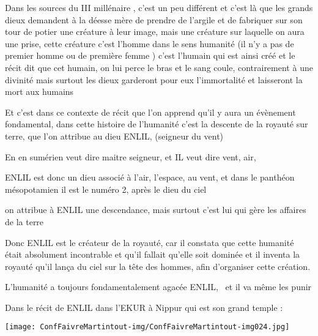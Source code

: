 \documentclass[a4paper]{article}
\begin{document}
{
Dans les sources du III millénaire , c'est un peu différent et c'est là
que les grands dieux demandent à la déesse mère de prendre de l'argile
et de fabriquer sur son tour de potier une créature à leur image, mais
une créature sur laquelle on aura une prise, cette créature c'est
l'homme dans le sens humanité (il n'y a pas de premier homme ou de
première femme ) c'est l'humain qui est ainsi créé et le récit dit que
cet humain, on lui perce le bras et le sang coule, contrairement à une
divinité mais surtout les dieux garderont pour eux l'immortalité et
laisseront la mort aux humains}

{
Et c'est dans ce contexte de récit que l'on apprend qu'il y aura un
évènement fondamental, dans cette histoire de l'humanité c'est la
descente de la royauté sur terre, que l'on attribue au dieu ENLIL,
(seigneur du vent)}

{
En en sumérien veut dire maitre seigneur, et IL veut dire vent, air, }

{
ENLIL est donc un dieu associé à l'air, l'espace, au vent, et dans le
panthéon mésopotamien il est le numéro 2, après le dieu du ciel}

{
on attribue à ENLIL une descendance, mais surtout c'est lui qui gère les
affaires de la terre}


\bigskip

{
Donc ENLIL est le créateur de la royauté, car il constata que cette
humanité était absolument incontrable et qu'il fallait qu'elle soit
dominée et il inventa la royauté qu'il lança du ciel sur la tête des
hommes, afin d'organiser cette création. }

{
L'humanité a toujours fondamentalement agacée ENLIL, \ et il va même les
punir}


\bigskip


\bigskip


\bigskip


\bigskip


\bigskip


\bigskip


\bigskip


\bigskip

{
Dans le récit de ENLIL dans l'EKUR à Nippur qui est son grand temple :}


\bigskip


\texttt{[image: ConfFaivreMartintout-img/ConfFaivreMartintout-img024.jpg]}
\end{document}
